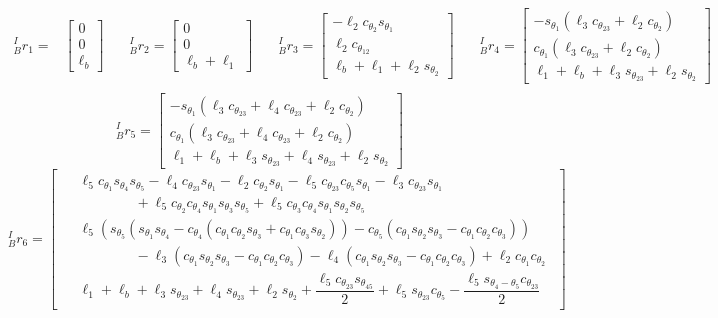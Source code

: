 \documentclass[12pt]{report}
\begin{document}
\[
\begin{aligned}
  ^I_Br_1 =&
  \begin{bmatrix}
    0\\ 0\\ \ell_b
  \end{bmatrix} & \quad
  ^I_Br_2 =
  \begin{bmatrix}
    0\\ 0\\ \ell_b + \ell_1
  \end{bmatrix} & \quad
  ^I_Br_3 =
  \begin{bmatrix}
    -\ell_2c_{\theta_2}s_{\theta_1}\\
    \ell_2c_{\theta_{12}}\\
    \ell_b+\ell_1+\ell_2s_{\theta_2}
  \end{bmatrix} & \quad
  ^I_Br_4 =
  \begin{bmatrix}
    -s_{\theta_1}(\ell_3c_{\theta_{23}} + \ell_2c_{\theta_2}) \\
    c_{\theta_1}(\ell_3c_{\theta_{23}} + \ell_2c_{\theta_2}) \\
    \ell_1 + \ell_b + \ell_3s_{\theta_{23}} + \ell_2s_{\theta_2}
  \end{bmatrix} \\
\end{aligned}
  \]
  \[
  ^I_Br_5 =
  \begin{bmatrix}
    -s_{\theta_1}(\ell_3c_{\theta_{23}} + \ell_4c_{\theta_{23}} + \ell_2c_{\theta_2}) \\
    c_{\theta_1}(\ell_3c_{\theta_{23}} + \ell_4c_{\theta_{23}} + \ell_2c_{\theta_2}) \\
    \ell_1 + \ell_b + \ell_3s_{\theta_{23}} + \ell_4s_{\theta_{23}} + \ell_2s_{\theta_2}
  \end{bmatrix}
  \]
  \[
  ^I_Br_6 =
  \begin{bmatrix}
  \begin{aligned}
      &\ell_5c_{\theta_1}s_{\theta_4}s_{\theta_5} - \ell_4c_{\theta_{23}}s_{\theta_1} - \ell_2c_{\theta_2}s_{\theta_1} - \ell_5c_{\theta_{23}}c_{\theta_5}s_{\theta_1} - \ell_3c_{\theta_{23}}s_{\theta_1} \\
      &\qquad\qquad+ \ell_5c_{\theta_2}c_{\theta_4}s_{\theta_1}s_{\theta_3}s_{\theta_5} + \ell_5c_{\theta_3}c_{\theta_4}s_{\theta_1}s_{\theta_2}s_{\theta_5} \\
      &\ell_5(s_{\theta_5}(s_{\theta_1}s_{\theta_4} - c_{\theta_4}(c_{\theta_1}c_{\theta_2}s_{\theta_3} + c_{\theta_1}c_{\theta_3}s_{\theta_2})) - c_{\theta_5}(c_{\theta_1}s_{\theta_2}s_{\theta_3} - c_{\theta_1}c_{\theta_2}c_{\theta_3})) \\
      &\qquad\qquad -\ell_3(c_{\theta_1}s_{\theta_2}s_{\theta_3} - c_{\theta_1}c_{\theta_2}c_{\theta_3}) -\ell_4(c_{\theta_1}s_{\theta_2}s_{\theta_3} - c_{\theta_1}c_{\theta_2}c_{\theta_3}) + \ell_2c_{\theta_1}c_{\theta_2} \\
      &\ell_1 + \ell_b + \ell_3s_{\theta_{23}} + \ell_4s_{\theta_{23}} + \ell_2s_{\theta_2} + \dfrac{\ell_5c_{\theta_{23}}s_{\theta_{45}}}{2} + \ell_5s_{\theta_{23}}c_{\theta_5} - \dfrac{\ell_5s_{\theta_4 - \theta_5}c_{\theta_{23}}}{2}
    \end{aligned}
  \end{bmatrix}
\]
\end{document}
